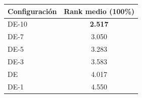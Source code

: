 \begin{tabular}{lc}
\toprule
\textbf{Configuración} & \textbf{Rank medio (100\%)} \\
\midrule
DE-10 & \textbf{2.517} \\
DE-7 & 3.050 \\
DE-5 & 3.283 \\
DE-3 & 3.583 \\
DE & 4.017 \\
DE-1 & 4.550 \\
\bottomrule
\end{tabular}
